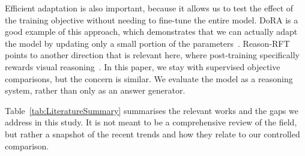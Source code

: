 \documentclass[12pt,bibliography=totoc,listof=totoc,BCOR=5mm,DIV=12,oneside,open=any]{scrbook}
\let\cite\citep
\begin{document}
Efficient adaptation is also important,
because it allows us to test the effect of the training objective without needing to fine-tune the entire model.
DoRA is a good example of this approach, which demonstrates that we can actually adapt the model by updating only a small portion of the parameters~\cite{liu2024dora}.
Reason-RFT points to another direction that is relevant here, where post-training specifically rewards visual reasoning~\cite{tan2025reasonrft}.
In this paper, we stay with supervised objective comparisons, but the concern is similar.
We evaluate the model as a reasoning system, rather than only as an answer generator.

Table~\ref{tab:LiteratureSummary} summarises the relevant works and the gaps we address in this study.
It is not meant to be a comprehensive review of the field, but rather a snapshot of the recent trends and how they relate to our controlled comparison.
\end{document}
